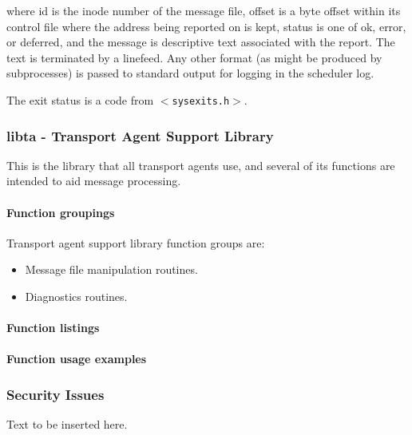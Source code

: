 where id is the inode number of the message file, offset
is a byte offset within its control file where the address
being reported on is kept, status is one of ok, error, or
deferred, and the message is descriptive text associated
with the report. The text is terminated by a linefeed.
Any other format (as might be produced by subprocesses) is
passed to standard output for logging in the scheduler
log.

The exit status is a code from {\tt {\(<\)}sysexits.h{\(>\)}}.






\subsubsection{libta - Transport Agent Support Library}



This is the library that all transport agents use, and several of its
functions are intended to aid message processing.




\paragraph{Function groupings}

Transport agent support library function groups are:

\begin{itemize}
\item Message file manipulation routines.
\item Diagnostics routines.
\end{itemize}





\paragraph{Function listings }


\paragraph{Function usage examples}


\subsubsection{Security Issues}

Text to be inserted here.

